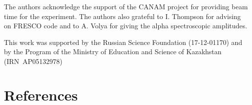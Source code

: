 \documentclass[10pt]{iopart}
\begin{document}
\ack
	The authors acknowledge the support of the CANAM project \cite{canam} for providing beam time for the experiment. The authors also grateful to I. Thompson for advising on FRESCO code and to A. Volya for giving the alpha spectroscopic amplitudes. 
	
	This work was supported by the Russian Science Foundation (17-12-01170) and by the Program of the Ministry of Education and Science of Kazakhstan (IRN~AP05132978) 



\section*{References}



\end{document}
